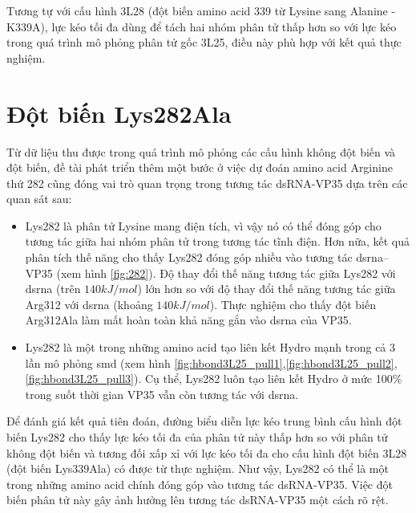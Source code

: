\documentclass[12pt,a4paper,reqno, oneside]{book}
\begin{document}
Tương tự với cấu hình 3L28 (đột biến amino acid 339 từ Lysine sang Alanine - \gls{K339A}), lực kéo tối đa dùng để tách hai nhóm phân tử thấp hơn so với lực kéo trong quá trình mô phỏng phân tử gốc 3L25, điều này phù hợp với kết quả thực nghiệm\cite{Leung2010}.
\section{Đột biến Lys282Ala}
Từ dữ liệu thu được trong quá trình mô phỏng các cấu hình không đột biến và đột biến, đề tài phát triển thêm một bước ở việc dự đoán amino acid Arginine thứ 282 cũng đóng vai trò quan trọng trong tương tác dsRNA-VP35 dựa trên các quan sát sau:
\begin{itemize}
\item Lys282 là phân tử Lysine mang điện tích, vì vậy nó có thể đóng góp cho tương tác giữa hai nhóm phân tử trong tương tác tĩnh điện. Hơn nữa, kết quả phân tích thế năng cho thấy Lys282 đóng góp nhiều vào tương tác \gls{dsrna}--VP35 (xem hình \ref{fig:282}). Độ thay đổi thế năng tương tác giữa Lys282 với \gls{dsrna} (trên $140kJ/mol$) lớn hơn so với độ thay đổi thế năng tương tác giữa Arg312 với \gls{dsrna} (khoảng $140kJ/mol$). Thực nghiệm cho thấy đột biến Arg312Ala làm mất hoàn toàn khả năng gắn vào \gls{dsrna} của VP35.
\item Lys282 là một trong những amino acid tạo liên kết Hydro mạnh trong cả 3 lần mô phỏng \gls{smd} (xem hình \ref{fig:hbond3L25_pull1},\ref{fig:hbond3L25_pull2},\ref{fig:hbond3L25_pull3}). Cụ thể, Lys282 luôn tạo liên kết Hydro ở mức 100\% trong suốt thời gian VP35 vẫn còn tương tác với \gls{dsrna}.
\end{itemize}
Để đánh giá kết quả tiên đoán, đường biểu diễn lực kéo trung bình cấu hình đột biến Lys282 cho thấy lực kéo tối đa của phân tử này thấp hơn so với phân tử không đột biến và tương đối xấp xỉ với lực kéo tối đa cho cấu hình đột biến 3L28 (đột biến Lys339Ala) có được từ thực nghiệm. Như vậy, Lys282 có thể là một trong những amino acid chính đóng góp vào tương tác dsRNA-VP35. Việc đột biến phân tử này gây ảnh hưởng lên tương tác dsRNA-VP35 một cách rõ rệt.
\end{document}
